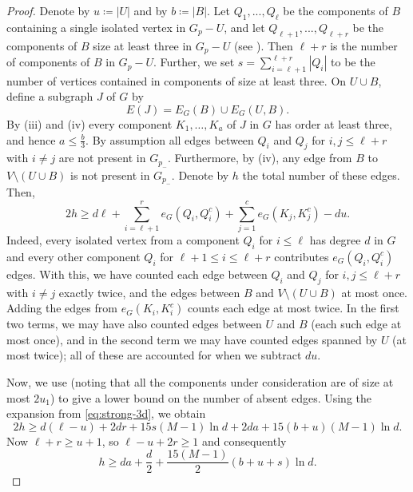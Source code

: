 \documentclass[10pt,a4paper]{article}
\begin{document}
\begin{proof}
Denote by $u\coloneqq |U|$ and by $b\coloneqq |B|$. Let $Q_1,...,Q_{\ell}$ be the components of $B$ containing a single isolated vertex in $G_p-U$, and let $Q_{\ell+1},..., Q_{\ell+r}$ be the components of $B$ size at least three in $G_p-U$ (see ). Then $\ell+r$ is the number of components of $B$ in $G_p-U$. Further, we set $s=\sum_{i=\ell+1}^{\ell+r} |Q_i|$ to be the number of vertices contained in components of size at least three.
On $U\cup B$, define a subgraph $J$ of $G$ by
\[
 E(J)=E_G(B)\cup E_G(U,B).
\]
By (iii) and (iv) every component $K_1,\ldots,K_a$ of $J$ in $G$ has order at least three, and hence $a\le \frac{b}{3}$. 
By assumption all edges between $Q_i$ and $Q_j$ for $i, j \leq \ell+r$ with $i \neq j$ are not present in $G_{p_-}$. Furthermore, by (iv), any edge from $B$ to $V\setminus (U \cup B)$ is not present in $G_{p_-}$. Denote by $h$ the total number of these edges. Then,
\begin{equation*}\label{eq:small-components-key}
 2h \ge d\ell+\sum_{i=\ell+1}^r e_G(Q_i,Q_i^c)+\sum_{j=1}^c e_G(K_j,K_j^c)-du.
\end{equation*}
Indeed, every isolated vertex from a component $Q_i$ for $i \leq \ell$ has degree $d$ in $G$ and every other component $Q_i$ for $\ell+1 \leq i \leq \ell+r$ contributes $e_G(Q_i, Q_i^c)$ edges. With this, we have counted each edge between $Q_i$ and $Q_j$ for $i,j\leq \ell+r$ with $i\neq j$ exactly twice, and the edges between $B$ and $V\setminus (U\cup B)$ at most once. 
Adding the edges from $e_G(K_i, K_i^c)$ counts each edge at most twice. In the first two terms, we may have also counted edges between $U$ and $B$ (each such edge at most once), and in the second term we may have counted edges spanned by $U$ (at most twice); all of these are accounted for when we subtract  $du$.  

Now, we use  (noting that all the components under consideration are of size at most $2u_1$) to give a lower bound on the number of absent edges. Using the expansion from \eqref{eq:strong-3d}, we obtain
\[
2h \geq d(\ell-u) + 2dr + 15 s (M-1) \ln d+2da+ 15 (b+u)(M-1) \ln d.
\]
Now $\ell+r \geq u+1$, so $\ell-u+2r \geq 1$ and consequently
\[
h \geq da + \frac{d}{2}+\frac{15(M-1)}{2} (b+u+s) \ln d.
\]


\end{proof}
\end{document}
